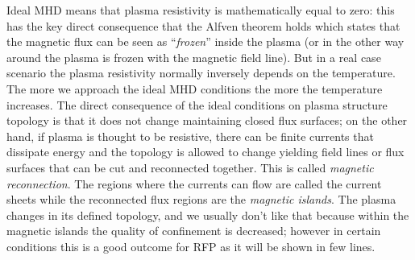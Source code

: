 Ideal MHD means that plasma resistivity is mathematically equal to zero: this has the key direct consequence that the Alfven theorem holds which states that the magnetic flux can be seen as ``\textit{frozen}'' inside the plasma (or in the other way around the plasma is frozen with the magnetic field line).
But in a real case scenario the plasma resistivity normally inversely depends on the temperature. The more we approach the ideal MHD conditions the more the temperature increases. The direct consequence of the ideal conditions on plasma structure topology is that it does not change maintaining closed flux surfaces; on the other hand, if plasma is thought to be resistive, there can be finite currents that dissipate energy and the topology is allowed to change yielding field lines or flux surfaces that can be cut and reconnected together. This is called \textit{magnetic reconnection}. The regions where the currents can flow are called the current sheets while the reconnected flux regions are the \textit{magnetic islands}. The plasma changes in its defined topology, and we usually don't like that because within the magnetic islands the quality of confinement is decreased; however in certain conditions this is a good outcome for RFP as it will be shown in few lines.

